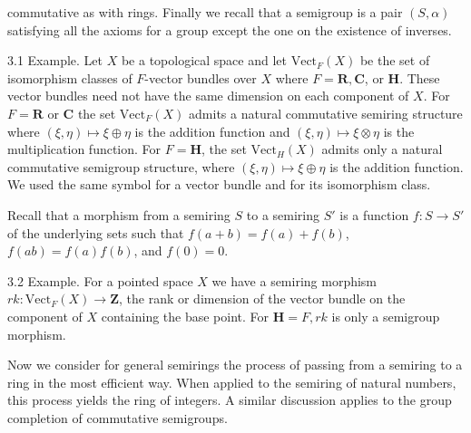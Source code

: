 commutative as with rings. Finally we recall that a semigroup is a pair $(S, \alpha)$ satisfying all the axioms for a group except the one on the existence of inverses.

3.1 Example. Let $X$ be a topological space and let $\text{Vect}_F(X)$ be the set of isomorphism classes of $F$-vector bundles over $X$ where $F = \mathbf{R}, \mathbf{C}$, or $\mathbf{H}$. These vector bundles need not have the same dimension on each component of $X$. For $F = \mathbf{R}$ or $\mathbf{C}$ the set $\text{Vect}_F(X)$ admits a natural commutative semiring structure where $(\xi, \eta) \mapsto \xi \oplus \eta$ is the addition function and $(\xi, \eta) \mapsto \xi \otimes \eta$ is the multiplication function. For $F = \mathbf{H}$, the set $\text{Vect}_H(X)$ admits only a natural commutative semigroup structure, where $(\xi, \eta) \mapsto \xi \oplus \eta$ is the addition function. We used the same symbol for a vector bundle and for its isomorphism class.

Recall that a morphism from a semiring $S$ to a semiring $S'$ is a function $f: S \rightarrow S'$ of the underlying sets such that $f(a + b) = f(a) + f(b)$, $f(ab) = f(a)f(b)$, and $f(0) = 0$.

3.2 Example. For a pointed space $X$ we have a semiring morphism $rk: \text{Vect}_F(X) \rightarrow \mathbf{Z}$, the rank or dimension of the vector bundle on the component of $X$ containing the base point. For $\mathbf{H} = F, rk$ is only a semigroup morphism.

Now we consider for general semirings the process of passing from a semiring to a ring in the most efficient way. When applied to the semiring of natural numbers, this process yields the ring of integers. A similar discussion applies to the group completion of commutative semigroups.
